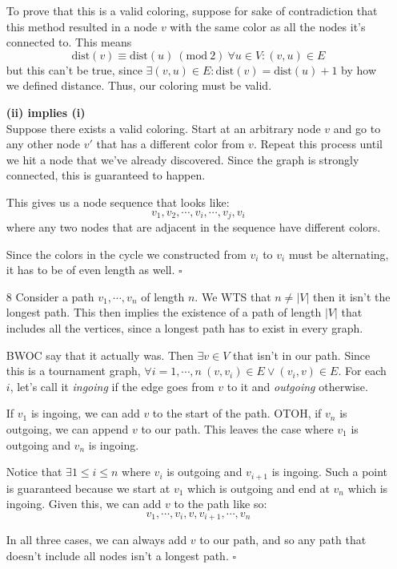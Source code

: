 \documentclass[12pt]{article}
\newcommand{\Mod}[1]{\ (\mathrm{mod}\ #1)}
\begin{document}
\begin{enumerate}
      To prove that this is a valid coloring, suppose for sake of contradiction
      that this method resulted in a node $v$ with the same color as all the nodes it's connected to.
      This means
      \[\text{dist}(v) \equiv \text{dist}(u) \Mod 2\ \forall u \in V: (v, u) \in E\]
      but this can't be true, since $\exists (v, u) \in E: \text{dist}(v)=\text{dist}(u)+1$
      by how we defined distance.
      Thus, our coloring must be valid.

      \textbf{(ii) implies (i)} \\
      Suppose there exists a valid coloring.
      Start at an arbitrary node $v$ and go to any other node $v'$
      that has a different color from $v$.
      Repeat this process until we hit a node that we've already discovered.
      Since the graph is strongly connected, this is guaranteed to happen.

      This gives us a node sequence that looks like:
      \[v_1, v_2, \cdots, v_i, \cdots, v_j, v_i\]
      where any two nodes that are adjacent in the sequence have different colors.
      
      Since the colors in the cycle we constructed from $v_i$ to $v_i$
      must be alternating, it has to be of even length as well. $\square$

      \item[8] Consider a path $v_1, \cdots, v_n$ of length $n$.
      We WTS that $n \ne |V|$ then it isn't the longest path.
      This then implies the existence of a path of length $|V|$
      that includes all the vertices, since a longest path has to
      exist in every graph.

      BWOC say that it actually was.
      Then $\exists v \in V$ that isn't in our path.
      Since this is a tournament graph,
      $\forall i=1, \cdots, n\ (v, v_i) \in E \lor (v_i, v) \in E$.
      For each $i$, let's call it \textit{ingoing} if the edge goes from $v$ to it
      and \textit{outgoing} otherwise.

      If $v_1$ is ingoing, we can add $v$ to the start of the path.
      OTOH, if $v_n$ is outgoing, we can append $v$ to our path.
      This leaves the case where $v_1$ is outgoing and $v_n$ is ingoing.

      Notice that $\exists 1 \le i \le n$ where $v_i$ is outgoing and $v_{i+1}$ is ingoing.
      Such a point is guaranteed because we start at $v_1$ which is outgoing
      and end at $v_n$ which is ingoing.
      Given this, we can add $v$ to the path like so:
      \[v_1, \cdots, v_i, v, v_{i+1}, \cdots, v_n\]
      
      In all three cases, we can always add $v$ to our path,
      and so any path that doesn't include all nodes isn't a longest path. $\square$
\end{enumerate}
\end{document}
